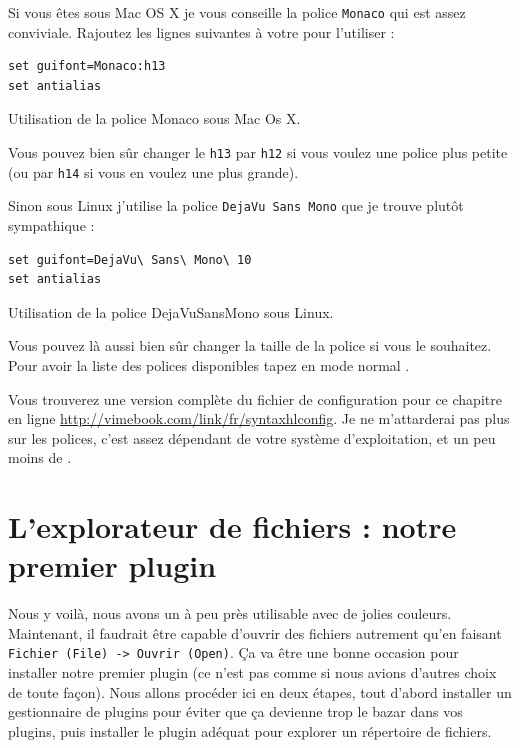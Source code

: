 Si vous êtes sous Mac OS X je vous conseille la police \Verb|Monaco| qui est assez conviviale. Rajoutez les lignes suivantes à votre \vimrc pour l'utiliser :

\begin{listing}[H]
\begin{verbatim}
set guifont=Monaco:h13
set antialias
\end{verbatim}
  \caption{Utilisation de la police Monaco sous Mac Os X.}
  \label{lst:monaco}
\end{listing}

Vous pouvez bien sûr changer le \Verb|h13| par \Verb|h12| si vous voulez une police plus petite (ou par \Verb|h14| si vous en voulez une plus grande).

Sinon sous Linux j'utilise la police \Verb|DejaVu Sans Mono| que je trouve plutôt sympathique :

\begin{listing}[H]
\begin{verbatim}
set guifont=DejaVu\ Sans\ Mono\ 10
set antialias
\end{verbatim}
  \caption{Utilisation de la police DejaVuSansMono sous Linux.}
  \label{lst:dejavusansmono}
\end{listing}

Vous pouvez là aussi bien sûr changer la taille de la police si vous le souhaitez. Pour avoir la liste des polices disponibles tapez en mode normal .

Vous trouverez une version complète du fichier de configuration pour ce chapitre en ligne \url{http://vimebook.com/link/fr/syntaxhlconfig}. Je ne m'attarderai pas plus sur les polices, c'est assez dépendant de votre système d'exploitation, et un peu moins de \vim.


\section{L'explorateur de fichiers : notre premier plugin}

Nous y voilà, nous avons un \vim à peu près utilisable avec de jolies couleurs. Maintenant, il faudrait être capable d'ouvrir des fichiers autrement qu'en faisant \Verb|Fichier (File) -> Ouvrir (Open)|. Ça va être une bonne occasion pour installer notre premier plugin (ce n'est pas comme si nous avions d'autres choix de toute façon). Nous allons procéder ici en deux étapes, tout d'abord installer un gestionnaire de plugins pour éviter que ça devienne trop le bazar dans vos plugins, puis installer le plugin adéquat pour explorer un répertoire de fichiers.

